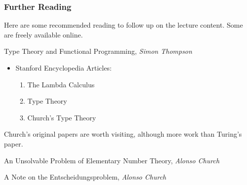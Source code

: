 \documentclass{beamer}
\begin{document}









	


\begin{frame}
	\frametitle{Further Reading}
	
	Here are some recommended reading to follow up on the lecture content. Some are freely available online. 

	\vspace{0.4cm}

	Type Theory and Functional Programming, \emph{Simon Thompson}
	
	\vspace{0.1cm}
	
	\begin{itemize}
		\item Stanford Encyclopedia Articles: 
			\begin{enumerate}
				\item The Lambda Calculus
				\item Type Theory
				\item Church's Type Theory
			\end{enumerate}
	\end{itemize}

	Church's original papers are worth visiting, although more work than Turing's paper. 

	An Unsolvable Problem of Elementary Number Theory, \emph{Alonso Church}

	\vspace{0.2cm}

	A Note on the Entscheidungsproblem, \emph{Alonso Church}
	
\end{frame}
\end{document}

